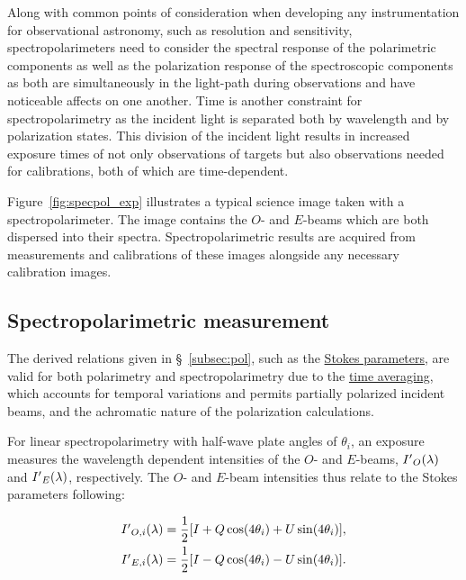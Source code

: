 Along with common points of consideration when developing any instrumentation for observational astronomy, such as resolution and sensitivity, spectropolarimeters need to consider the spectral response of the polarimetric components as well as the polarization response of the spectroscopic components as both are simultaneously in the light-path during observations and have noticeable affects on one another. Time is another constraint for spectropolarimetry as the incident light is separated both by wavelength and by polarization states. This division of the incident light results in increased exposure times of not only observations of targets but also observations needed for calibrations, both of which are time-dependent.
\prgph

Figure~\ref{fig:specpol_exp} illustrates a typical science image taken with a spectropolarimeter. The image contains the $O$- and $E$-beams which are both dispersed into their spectra. Spectropolarimetric results are acquired from measurements and calibrations of these images alongside any necessary calibration images.


\subsection{Spectropolarimetric measurement}

The derived relations given in \S~\ref{subsec:pol}, such as the \hyperref[eq:Stokes_params]{Stokes parameters}, are valid for both polarimetry and spectropolarimetry due to the \hyperref[eq:pol_t_avg]{time averaging}, which accounts for temporal variations and permits partially polarized incident beams, and the achromatic nature of the polarization calculations.
\prgph

For linear spectropolarimetry with half-wave plate angles of $\theta_{i}$, an exposure measures the wavelength dependent intensities of the $O$- and $E$-beams, $I\hbox{$^\prime$}_{O}(\lambda)$ and $I\hbox{$^\prime$}_{E}(\lambda)$, respectively. The $O$- and $E$-beam intensities thus relate to the Stokes parameters following:

\begin{equation}
  \begin{gathered}
    I\hbox{$^\prime$}_{O, i}(\lambda) = \frac{1}{2} [I + Q\cos(4\theta_{i}) + U\sin(4\theta_{i})], \\
    I\hbox{$^\prime$}_{E, i}(\lambda) = \frac{1}{2} [I - Q\cos(4\theta_{i}) - U\sin(4\theta_{i})].
  \end{gathered}
  \label{eq:specpol_flux_to_Stokes}
\end{equation}

